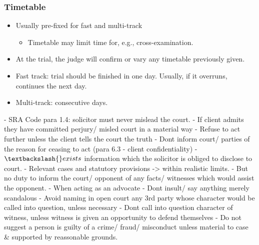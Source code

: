 \documentclass[
]{article}
\newenvironment{Shaded}{}{}
\newcommand{\NormalTok}[1]{#1}
\providecommand{\tightlist}{%
  \setlength{\itemsep}{0pt}\setlength{\parskip}{0pt}}
\begin{document}
\hypertarget{timetable}{%
\subsubsection{Timetable}\label{timetable}}

\begin{itemize}
\tightlist
\item
  Usually pre-fixed for fast and multi-track

  \begin{itemize}
  \tightlist
  \item
    Timetable may limit time for, e.g., cross-examination.
  \end{itemize}
\item
  At the trial, the judge will confirm or vary any timetable previously
  given.
\item
  Fast track: trial should be finished in one day. Usually, if it
  overruns, continues the next day.
\item
  Multi-track: consecutive days.
\end{itemize}

\begin{Shaded}
\begin{Highlighting}[]
\NormalTok{{-} SRA Code para 1.4: solicitor must never mislead the court. }
\NormalTok{{-} If client admits they have committed perjury/ misled court in a material way}
\NormalTok{    {-} Refuse to act further unless the client tells the court the truth}
\NormalTok{    {-} Don\textquotesingle{}t inform court/ parties of the reason for ceasing to act (para 6.3 {-} client confidentiality)}
\NormalTok{{-} $\textbackslash{}exists$ information which the solicitor is obliged to disclose to court. }
\NormalTok{    {-} Relevant cases and statutory provisions {-}\textgreater{} within realistic limits. }
\NormalTok{    {-} But no duty to inform the court/ opponent of any facts/ witnesses which would assist the opponent. }
\NormalTok{{-} When acting as an advocate}
\NormalTok{    {-} Don\textquotesingle{}t insult/ say anything merely scandalous}
\NormalTok{    {-} Avoid naming in open court any 3rd party whose character would be called into question, unless necessary}
\NormalTok{    {-} Don\textquotesingle{}t call into question character of witness, unless witness is given an opportunity to defend themselves}
\NormalTok{    {-} Do not suggest a person is guilty of a crime/ fraud/ misconduct unless material to case \& supported by reassonable grounds. }
\end{Highlighting}
\end{Shaded}
\end{document}
